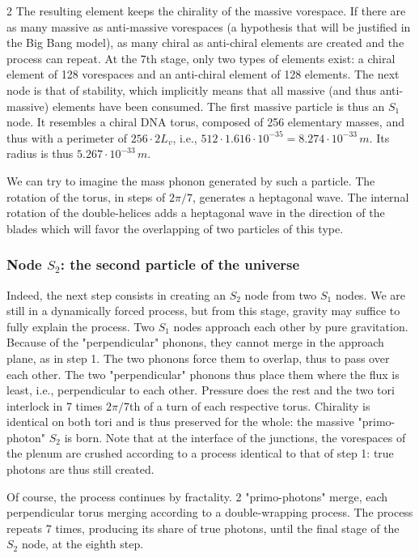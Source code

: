 \begin{multicols}{2}
	The resulting element keeps the chirality of the massive vorespace. If 
	there are as many massive as anti-massive vorespaces (a hypothesis that 
	will be justified in the Big Bang model), as many chiral as 
	anti-chiral elements are created and the process can repeat. At the 7th 
	stage, only two types of elements exist: a chiral element of 128 
	vorespaces and an anti-chiral element of 128 elements. The next node is 
	that of stability, which implicitly means that all massive (and thus 
	anti-massive) elements have been consumed. The first massive particle is 
	thus an $S_1$ node. It resembles a chiral DNA torus, composed of 256 
	elementary masses, and thus with a perimeter of $256 \cdot 2L_v$, i.e., 
	$512 \cdot 1.616 \cdot 10^{-35} = 8.274 \cdot 10^{-33}\,m$. Its radius is thus 
	$5.267 \cdot 10^{-33}\,m$.
	
	We can try to imagine the mass phonon generated by such a particle. The 
	rotation of the torus, in steps of $2\pi/7$, generates a heptagonal wave. 
	The internal rotation of the double-helices adds a heptagonal wave in 
	the direction of the blades which will favor the overlapping of two 
	particles of this type.
	
	\subsubsection{Node $S_2$: the second particle of the universe}
	
	Indeed, the next step consists in creating an $S_2$ node from two $S_1$ 
	nodes. We are still in a dynamically forced process, but from this 
	stage, gravity may suffice to fully explain the process. Two $S_1$ nodes 
	approach each other by pure gravitation. Because of the "perpendicular" 
	phonons, they cannot merge in the approach plane, as in step 1. The two 
	phonons force them to overlap, thus to pass over each other. The two 
	"perpendicular" phonons thus place them where the flux is least, i.e., 
	perpendicular to each other. Pressure does the rest and the two tori 
	interlock in 7 times $2\pi/7$th of a turn of each respective torus. 
	Chirality is identical on both tori and is thus preserved for the whole: 
	the massive "primo-photon" $S_2$ is born. Note that at the interface of 
	the junctions, the vorespaces of the plenum are crushed according to a 
	process identical to that of step 1: true photons are thus still created.
	
	Of course, the process continues by fractality. 2 "primo-photons" merge, 
	each perpendicular torus merging according to a double-wrapping 
	process. The process repeats 7 times, producing its share of true 
	photons, until the final stage of the $S_2$ node, at the eighth step.
	

\end{multicols}
